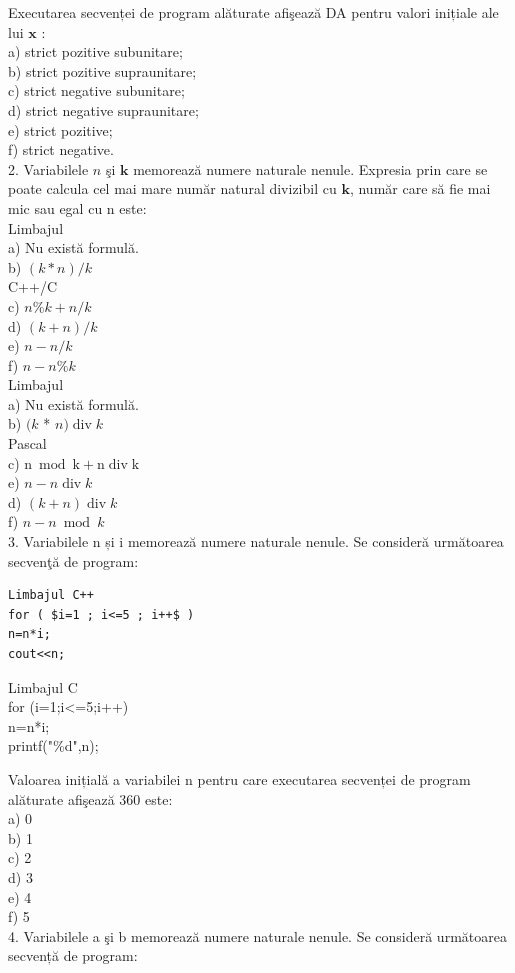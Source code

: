 \documentclass[10pt]{article}
\begin{document}
Executarea secvenței de program alăturate afişează DA pentru valori inițiale ale lui $\mathbf{x}$ :\\
a) strict pozitive subunitare;\\
b) strict pozitive supraunitare;\\
c) strict negative subunitare;\\
d) strict negative supraunitare;\\
e) strict pozitive;\\
f) strict negative.\\
2. Variabilele $n$ şi $\mathbf{k}$ memorează numere naturale nenule. Expresia prin care se poate calcula cel mai mare număr natural divizibil cu $\mathbf{k}$, număr care să fie mai mic sau egal cu n este:\\
Limbajul\\
a) Nu există formulă.\\
b) $(k * n) / k$\\
C++/C\\
c) $n \% k+n / k$\\
d) $(k+n) / k$\\
e) $n-n / k$\\
f) $n-n \% k$\\
Limbajul\\
a) Nu există formulă.\\
b) $(k$ * $n) \operatorname{div} k$\\
Pascal\\
c) $\mathrm{n} \bmod \mathrm{k}+\mathrm{n} \operatorname{div} \mathrm{k}$\\
e) $n-n \operatorname{div} k$\\
d) $(k+n) \operatorname{div} k$\\
f) $n-n \bmod k$\\
3. Variabilele n și i memorează numere naturale nenule. Se consideră următoarea secvenţă de program:

\begin{verbatim}
Limbajul C++
for ( $i=1 ; i<=5 ; i++$ )
n=n*i;
cout<<n;
\end{verbatim}

Limbajul C\\
for (i=1;i<=5;i++)\\
n=n*i;\\
printf("\%d",n);

Valoarea inițială a variabilei n pentru care executarea secvenței de program alăturate afişează 360 este:\\
a) 0\\
b) 1\\
c) 2\\
d) 3\\
e) 4\\
f) 5\\
4. Variabilele a şi b memorează numere naturale nenule. Se consideră următoarea secvență de program:
\end{document}
